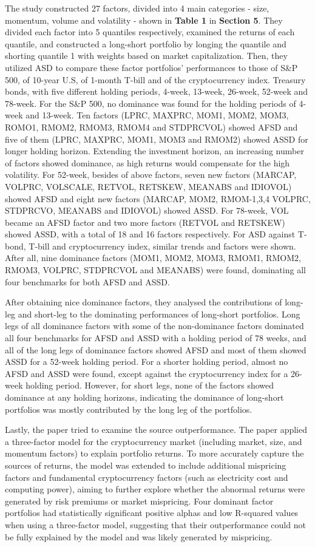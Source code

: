 \documentclass{article}
\begin{document}
The study constructed 27 factors, divided into 4 main categories - size, momentum, volume and volatility - shown in {\bf Table 1} in {\bf Section 5}. They divided each factor into 5 quantiles respectively, examined the returns of each quantile, and constructed a long-short portfolio by longing the quantile and shorting quantile 1 with weights based on market capitalization. Then, they utilized ASD to compare these factor portfolios' performances to those of S\&P 500, of 10-year U.S, of 1-month T-bill and of the cryptocurrency index. Treasury bonds, with five different holding periods, 4-week, 13-week, 26-week, 52-week and 78-week. For the S\&P 500, no dominance was found for the holding periods of 4-week and 13-week. Ten factors (LPRC, MAXPRC, MOM1, MOM2, MOM3, ROMO1, RMOM2, RMOM3, RMOM4 and STDPRCVOL) showed AFSD and five of them (LPRC, MAXPRC, MOM1, MOM3 and RMOM2) showed ASSD for longer holding horizon. Extending the investment horizon, an increasing number of factors showed dominance, as high returns would compensate for the high volatility. For 52-week, besides of above factors, seven new factors (MARCAP, VOLPRC, VOLSCALE, RETVOL, RETSKEW, MEANABS and IDIOVOL) showed AFSD and eight new factors (MARCAP, MOM2, RMOM-1,3,4 VOLPRC, STDPRCVO, MEANABS and IDIOVOL) showed ASSD. For 78-week, VOL became an AFSD factor and two more factors (RETVOL and RETSKEW) showed ASSD, with a total of 18 and 16 factors respectively. For ASD against T-bond, T-bill and cryptocurrency index, similar trends and factors were shown. After all, nine dominance factors (MOM1, MOM2, MOM3, RMOM1, RMOM2, RMOM3, VOLPRC, STDPRCVOL and MEANABS) were found, dominating all four benchmarks for both AFSD and ASSD.  

After obtaining nice dominance factors, they analysed the contributions of long-leg and short-leg to the dominating performances of long-short portfolios. Long legs of all dominance factors with some of the non-dominance factors dominated all four benchmarks for AFSD and ASSD with a holding period of 78 weeks, and all of the long legs of dominance factors showed AFSD and most of them showed ASSD for a 52-week holding period. For a shorter holding period, almost no AFSD and ASSD were found, except against the cryptocurrency index for a 26-week holding period. However, for short legs, none of the factors showed dominance at any holding horizons, indicating the dominance of long-short portfolios was mostly contributed by the long leg of the portfolios.

Lastly, the paper tried to examine the source outperformance. The paper applied a three-factor model for the cryptocurrency market (including market, size, and momentum factors) to explain portfolio returns. To more accurately capture the sources of returns, the model was extended to include additional mispricing factors and fundamental cryptocurrency factors (such as electricity cost and computing power), aiming to further explore whether the abnormal returns were generated by risk premiums or market mispricing. Four dominant factor portfolios had statistically significant positive alphas and low R-squared values when using a three-factor model, suggesting that their outperformance could not be fully explained by the model and was likely generated by mispricing. 
\end{document}
